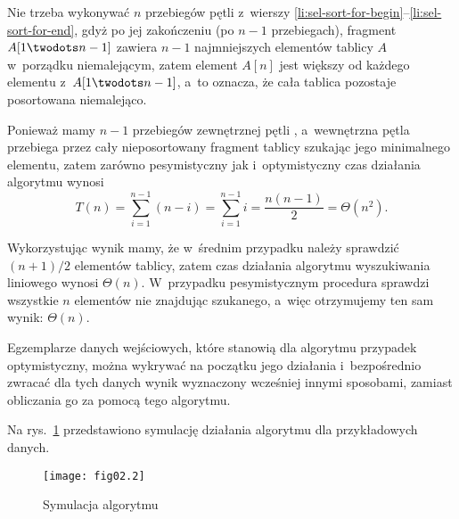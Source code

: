 Nie trzeba wykonywać $n$ przebiegów pętli  z~wierszy \ref{li:sel-sort-for-begin}\nobreakdash--\ref{li:sel-sort-for-end}, gdyż po jej zakończeniu (po $n-1$ przebiegach), fragment $A[1\twodots n-1]$ zawiera $n-1$ najmniejszych elementów tablicy $A$ w~porządku niemalejącym, zatem element $A[n]$ jest większy od każdego elementu z~$A[1\twodots n-1]$, a~to oznacza, że cała tablica pozostaje posortowana niemalejąco.

Ponieważ mamy $n-1$ przebiegów zewnętrznej pętli , a~wewnętrzna pętla  przebiega przez cały nieposortowany fragment tablicy szukając jego minimalnego elementu, zatem zarówno pesymistyczny jak i~optymistyczny czas działania algorytmu wynosi
\[
	T(n) = \sum_{i=1}^{n-1}(n-i) = \sum_{i=1}^{n-1}i = \frac{n(n-1)}{2} = \Theta(n^2).
\]

\exercise %
Wykorzystując wynik  mamy, że w~średnim przypadku należy sprawdzić $(n+1)/2$ elementów tablicy, zatem czas działania algorytmu wyszukiwania liniowego wynosi $\Theta(n)$. W~przypadku pesymistycznym procedura sprawdzi wszystkie $n$ elementów nie znajdując szukanego, a~więc otrzymujemy ten sam wynik: $\Theta(n)$.

\exercise %
Egzemplarze danych wejściowych, które stanowią dla algorytmu przypadek optymistyczny, można wykrywać na początku jego działania i~bezpośrednio zwracać dla tych danych wynik wyznaczony wcześniej innymi sposobami, zamiast obliczania go za pomocą tego algorytmu.


\exercise %
Na rys.~\ref{fig:2.3-1} przedstawiono symulację działania algorytmu  dla przykładowych danych.
\begin{figure}[!ht]
	\begin{center}
		\texttt{[image: fig02.2]}
	\end{center}
	\caption{Symulacja algorytmu } \label{fig:2.3-1}
\end{figure}

